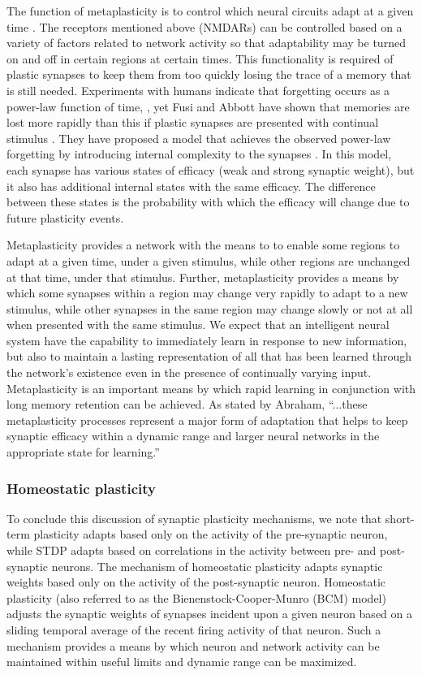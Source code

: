 \documentclass[twocolumn]{article}
\begin{document}
The function of metaplasticity is to control which neural circuits adapt at a given time \cite{ab2008}. The receptors mentioned above (NMDARs) can be controlled based on a variety of factors related to network activity so that adaptability may be turned on and off in certain regions at certain times. This functionality is required of plastic synapses to keep them from too quickly losing the trace of a memory that is still needed. Experiments with humans indicate that forgetting occurs as a power-law function of time, \cite{wieb1991,wieb1997}, yet Fusi and Abbott have shown that memories are lost more rapidly than this if plastic synapses are presented with continual stimulus \cite{fuab2007}. They have proposed a model that achieves the observed power-law forgetting by introducing internal complexity to the synapses \cite{fudr2005}. In this model, each synapse has various states of efficacy (weak and strong synaptic weight), but it also has additional internal states with the same efficacy. The difference between these states is the probability with which the efficacy will change due to future plasticity events. 

Metaplasticity provides a network with the means to to enable some regions to adapt at a given time, under a given stimulus, while other regions are unchanged at that time, under that stimulus. Further, metaplasticity provides a means by which some synapses within a region may change very rapidly to adapt to a new stimulus, while other synapses in the same region may change slowly or not at all when presented with the same stimulus. We expect that an intelligent neural system have the capability to immediately learn in response to new information, but also to maintain a lasting representation of all that has been learned through the network's existence even in the presence of continually varying input. Metaplasticity is an important means by which rapid learning in conjunction with long memory retention can be achieved. As stated by Abraham, ``...these metaplasticity processes represent a major form of adaptation that helps to keep synaptic efficacy within a dynamic range and larger neural networks in the appropriate state for learning.''

\subsubsection{Homeostatic plasticity}
To conclude this discussion of synaptic plasticity mechanisms, we note that short-term plasticity adapts based only on the activity of the pre-synaptic neuron, while STDP adapts based on correlations in the activity between pre- and post-synaptic neurons. The mechanism of homeostatic plasticity \cite{cube2012} adapts synaptic weights based only on the activity of the post-synaptic neuron. Homeostatic plasticity (also referred to as the Bienenstock-Cooper-Munro (BCM) model) adjusts the synaptic weights of synapses incident upon a given neuron based on a sliding temporal average of the recent firing activity of that neuron. Such a mechanism provides a means by which neuron and network activity can be maintained within useful limits and dynamic range can be maximized.
\end{document}
